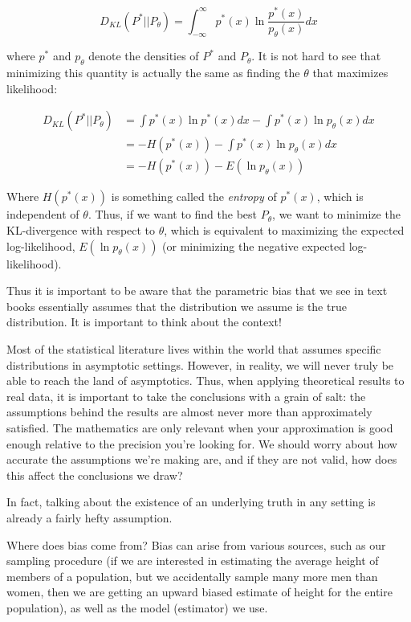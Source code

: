 $$D_{KL}(P^* \vert \vert P_\theta) = \int_{-\infty}^\infty p^*(x) \ln \frac{p^*(x)}{p_{\theta}(x)} dx$$

where $p^*$ and $p_\theta$ denote the densities of $P^*$ and $P_\theta$. It is not hard to see that minimizing this quantity is actually the same as finding the $\theta$ that maximizes likelihood:

$$
\begin{aligned}
D_{KL}(P^* \vert \vert P_\theta) & = \int p^*(x) \ln p^*(x) dx - \int p^*(x) \ln p_\theta(x) dx\\
& = - H\left(p^*(x)\right) - \int p^*(x) \ln p_\theta(x) dx\\
& = - H\left(p^*(x)\right) - E\left(\ln p_\theta(x) \right)
\end{aligned}
$$

Where $H\left(p^*(x)\right)$ is something called the \emph{entropy} of $p^*(x)$, which is independent of $\theta$. Thus, if we want to find the best $P_{\theta}$, we want to minimize the KL-divergence with respect to $\theta$, which is equivalent to maximizing the expected log-likelihood, $E(\ln p_\theta(x))$ (or minimizing the negative expected log-likelihood).



Thus it is important to be aware that the parametric bias that we see in text books essentially assumes that the distribution we assume is the true distribution. It is important to think about the context! 



Most of the statistical literature lives within the world that assumes specific distributions in asymptotic settings. However, in reality, we will never truly be able to reach the land of asymptotics. Thus, when applying theoretical results to real data, it is important to take the conclusions with a grain of salt: the assumptions behind the results are almost never more than approximately satisfied. The mathematics are only relevant when your approximation is good enough relative to the precision you're looking for. We should worry about how accurate the assumptions we're making are, and if they are not valid, how does this affect the conclusions we draw?

In fact, talking about the existence of an underlying truth in any setting is already a fairly hefty assumption. 




Where does bias come from? Bias can arise from various sources, such as our sampling procedure (if we are interested in estimating the average height of members of a population, but we accidentally sample many more men than women, then we are getting an upward biased estimate of height for the entire population), as well as the model (estimator) we use.

